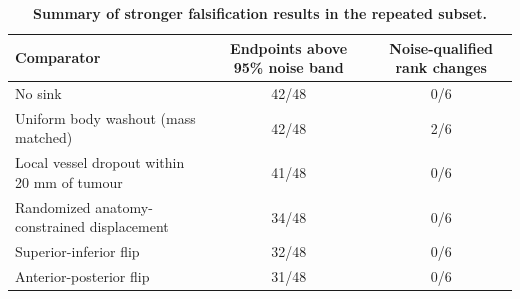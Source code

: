 \begin{table}[H]
\centering
\caption{\textbf{Summary of stronger falsification results in the repeated subset.}}
\label{tab:falsification_summary}
\small
\begin{tabular}{p{5.6cm}cc}
\toprule
Comparator & Endpoints above 95\% noise band & Noise-qualified rank changes \\
\midrule
No sink & 42/48 & 0/6 \\
Uniform body washout (mass matched) & 42/48 & 2/6 \\
Local vessel dropout within 20 mm of tumour & 41/48 & 0/6 \\
Randomized anatomy-constrained displacement & 34/48 & 0/6 \\
Superior-inferior flip & 32/48 & 0/6 \\
Anterior-posterior flip & 31/48 & 0/6 \\
\bottomrule
\end{tabular}
\end{table}
